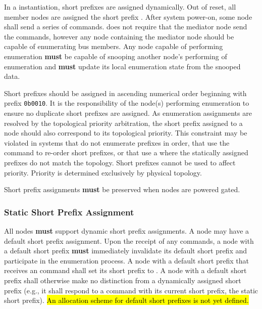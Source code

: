 In a \bus instantiation, short prefixes are assigned dynamically. Out of
reset, all member nodes are assigned the short prefix
. After system power-on, some node
shall send a series of  commands. \bus does not
require that the mediator node send the  commands,
however any node containing the mediator node should be capable of enumerating
bus members. Any node capable of performing enumeration {\bf must} be capable
of snooping another node's performing of enumeration and {\bf must} update its
local enumeration state from the snooped data.

Short prefixes should be assigned in ascending numerical order beginning with
prefix {\tt 0b0010}.
It is the responsibility of the
node(s) performing enumeration to ensure no duplicate short prefixes are
assigned.
As enumeration assignments are resolved by the
topological priority arbitration, the short prefix assigned to a node should
also correspond to its topological priority.
This constraint may be violated in systems that do not enumerate prefixes in
order, that use the
 command to re-order short prefixes, or
that use a  where the statically
assigned prefixes do not match the topology. Short prefixes cannot be used to
affect priority. Priority is determined exclusively by physical topology.

Short prefix assignments {\bf must} be preserved when nodes are powered gated.

\subsubsection{Static Short Prefix Assignment}
\label{sec:addressing-static-short-prefix}
All \bus nodes {\bf must} support dynamic short prefix assignments. A node may
have a default short prefix assignment. Upon the receipt of any
 commands, a node with a default short prefix {\bf
must} immediately invalidate its default short prefix and participate in the
enumeration process. A node with a default short prefix that receives an
 command shall set its short prefix to
. A node with a default short prefix
shall otherwise make no distinction from a dynamically assigned short prefix
(e.g., it shall respond to a  command with its
current short prefix, the static short prefix).
\hl{An allocation scheme for default short prefixes is not yet defined.}


